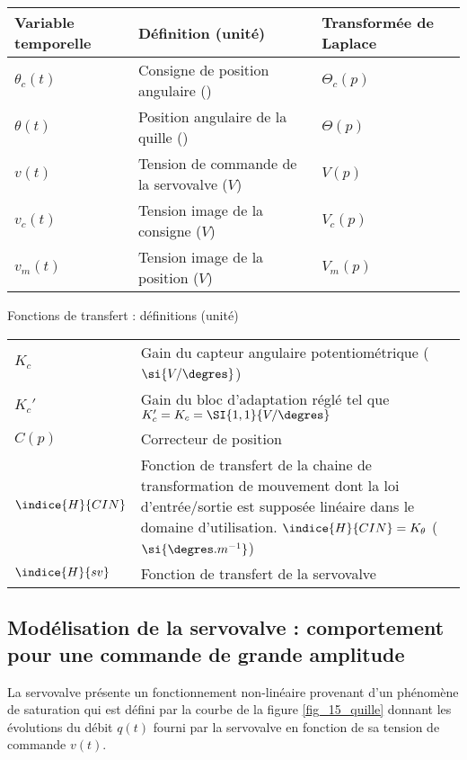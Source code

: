 \begin{center}
\begin{tabular}{lll}
\hline
Variable temporelle	& Définition (unité)				& Transformée de Laplace \\
\hline
$\theta_c(t)$		& Consigne de position angulaire (\degres)	& $\Theta_c(p)$ \\
$\theta(t)$		& Position angulaire de la quille (\degres)	& $\Theta(p)$ \\
$v(t)$			& Tension de commande de la servovalve ($V$)	& $V(p)$ 	\\
$v_c(t)$		& Tension image de la consigne ($V$)		& $V_c(p)$ 	\\
$v_m(t)$ 	 	& Tension image de la position ($V$)		& $V_m(p)$ 	\\
\hline
\end{tabular}
\end{center}



\begin{center}
Fonctions de transfert : définitions (unité)
\begin{tabular}{lp{14cm}}
\hline
$K_c$			& Gain du capteur angulaire potentiométrique ($\si{V/\degres}$) \\
$K_c'$			& Gain du bloc d’adaptation réglé tel que $K_c' = K_c = \SI{1,1}{V/\degres}$ \\
$C(p)$			& Correcteur de position 	\\
$\indice{H}{CIN}$ 	& Fonction de transfert de la chaine de transformation de mouvement 
			dont la loi d’entrée/sortie est supposée linéaire dans le domaine d’utilisation.                
			 $\indice{H}{CIN} = K_{\theta}$ ($\si{\degres.m^{-1}}$) \\
$\indice{H}{sv}$	& Fonction de transfert de la servovalve  \\
\hline
\end{tabular}
\end{center}




\subsection{Modélisation de la servovalve : comportement pour une commande de grande amplitude}

La servovalve présente un fonctionnement non-linéaire provenant d’un phénomène de saturation qui est défini par la courbe de la figure \ref{fig_15_quille} donnant les évolutions du débit $q(t)$ fourni par la servovalve en fonction de sa tension de commande $v(t)$. 

